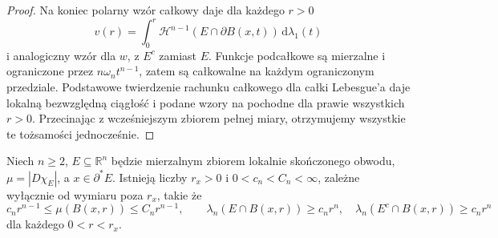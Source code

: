 \begin{proof}
Na koniec polarny wzór całkowy daje dla każdego $r>0$
\[
 v(r)=\int_0^r\mathcal H^{n-1}(E\cap\partial B(x,t))
 \,\mathrm d\lambda_1(t)
\]
i analogiczny wzór dla $w$, z $E^c$ zamiast $E$.
Funkcje podcałkowe są mierzalne i ograniczone przez
$n\omega_n t^{n-1}$, zatem są całkowalne na każdym
ograniczonym przedziale. Podstawowe twierdzenie
rachunku całkowego dla całki Lebesgue'a daje
lokalną bezwzględną ciągłość i podane wzory
na pochodne dla prawie wszystkich $r>0$.
Przecinając z wcześniejszym zbiorem pełnej miary,
otrzymujemy wszystkie te tożsamości jednocześnie.
\end{proof}

\begin{lemat}
\label{lem:dg-density}
Niech $n\ge2$, $E\subseteq\mathbb R^n$ będzie
mierzalnym zbiorem lokalnie skończonego obwodu,
$\mu=|D\chi_E|$, a $x\in\partial^*E$.
Istnieją liczby $r_x>0$ i $0<c_n<C_n<\infty$,
zależne wyłącznie od wymiaru poza $r_x$, takie że
\[
 c_nr^{n-1}\le\mu(B(x,r))\le C_nr^{n-1},\qquad
 \lambda_n(E\cap B(x,r))\ge c_nr^n,\quad
 \lambda_n(E^c\cap B(x,r))\ge c_nr^n
\]
dla każdego $0<r<r_x$.
\end{lemat}

